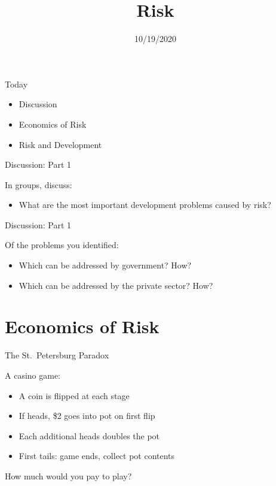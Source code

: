 \documentclass[ignorenonframetext,]{beamer}
\title{Risk}
\author{}
\date{\vspace{-2.5em}10/19/2020}
\providecommand{\tightlist}{%
  \setlength{\itemsep}{0pt}\setlength{\parskip}{0pt}}
\begin{document}
\frame{\titlepage}

\begin{frame}{Today}
\protect\hypertarget{today}{}

\begin{itemize}
\tightlist
\item
  Discussion
\item
  Economics of Risk
\item
  Risk and Development
\end{itemize}

\end{frame}

\begin{frame}{Discussion: Part 1}
\protect\hypertarget{discussion-part-1}{}

In groups, discuss:

\begin{itemize}
\tightlist
\item
  What are the most important development problems caused by risk?
\end{itemize}

\end{frame}

\begin{frame}{Discussion: Part 1}
\protect\hypertarget{discussion-part-1-1}{}

Of the problems you identified:

\begin{itemize}
\tightlist
\item
  Which can be addressed by government? How?
\item
  Which can be addressed by the private sector? How?
\end{itemize}

\end{frame}

\hypertarget{economics-of-risk}{%
\section{Economics of Risk}\label{economics-of-risk}}

\begin{frame}{The St.~Petersburg Paradox}
\protect\hypertarget{the-st.petersburg-paradox}{}

A casino game:

\begin{itemize}
\tightlist
\item
  A coin is flipped at each stage
\item
  If heads, \$2 goes into pot on first flip
\item
  Each additional heads doubles the pot
\item
  First tails: game ends, collect pot contents
\end{itemize}

How much would you pay to play?

\end{frame}
\end{document}

